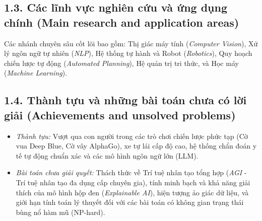 \documentclass[../main.tex]{subfiles}
\begin{document}
\subsection{1.3. Các lĩnh vực nghiên cứu và ứng dụng chính (Main research and application areas)}
Các nhánh chuyên sâu cốt lõi bao gồm: Thị giác máy tính (\textit{Computer Vision}), Xử lý ngôn ngữ tự nhiên (\textit{NLP}), Hệ thống tự hành và Robot (\textit{Robotics}), Quy hoạch chiến lược tự động (\textit{Automated Planning}), Hệ quản trị tri thức, và Học máy (\textit{Machine Learning}).

\subsection{1.4. Thành tựu và những bài toán chưa có lời giải (Achievements and unsolved problems)}
\begin{itemize}
    \item \textit{Thành tựu:} Vượt qua con người trong các trò chơi chiến lược phức tạp (Cờ vua Deep Blue, Cờ vây AlphaGo), xe tự lái cấp độ cao, hệ thống chẩn đoán y tế tự động chuẩn xác và các mô hình ngôn ngữ lớn (LLM).
    \item \textit{Bài toán chưa giải quyết:} Thách thức về Trí tuệ nhân tạo tổng hợp (\textit{AGI} - Trí tuệ nhân tạo đa dụng cấp chuyên gia), tính minh bạch và khả năng giải thích của mô hình hộp đen (\textit{Explainable AI}), hiện tượng ảo giác dữ liệu, và giới hạn tính toán lý thuyết đối với các bài toán có không gian trạng thái bùng nổ hàm mũ (NP-hard).
\end{itemize}
\end{document}
